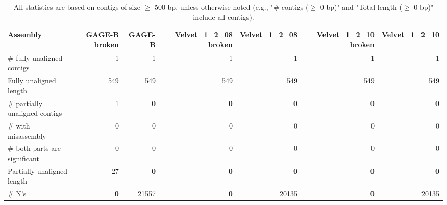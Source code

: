 \documentclass[12pt,a4paper]{article}
\begin{document}
\begin{table}[ht]
\begin{center}
\caption{All statistics are based on contigs of size $\geq$ 500 bp, unless otherwise noted (e.g., "\# contigs ($\geq$ 0 bp)" and "Total length ($\geq$ 0 bp)" include all contigs).}
\begin{tabular}{|l*{6}{|r}|}
\hline
Assembly & GAGE-B broken & GAGE-B & Velvet\_1\_2\_08 broken & Velvet\_1\_2\_08 & Velvet\_1\_2\_10 broken & Velvet\_1\_2\_10 \\ \hline
\# fully unaligned contigs & 1 & 1 & 1 & 1 & 1 & 1 \\ \hline
Fully unaligned length & 549 & 549 & 549 & 549 & 549 & 549 \\ \hline
\# partially unaligned contigs & 1 & {\bf 0} & {\bf 0} & {\bf 0} & {\bf 0} & {\bf 0} \\ \hline
\hspace{5mm}\# with misassembly & 0 & 0 & 0 & 0 & 0 & 0 \\ \hline
\hspace{5mm}\# both parts are significant & 0 & 0 & 0 & 0 & 0 & 0 \\ \hline
Partially unaligned length & 27 & {\bf 0} & {\bf 0} & {\bf 0} & {\bf 0} & {\bf 0} \\ \hline
\# N's & {\bf 0} & 21557 & {\bf 0} & 20135 & {\bf 0} & 20135 \\ \hline
\end{tabular}
\end{center}
\end{table}
\end{document}
